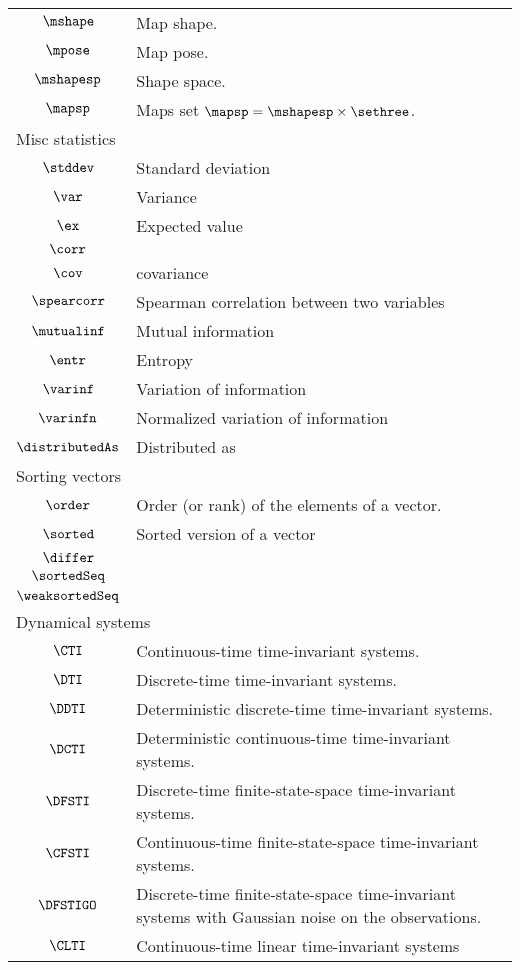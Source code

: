 \begin{longtable}{cl}
 \hline
$\mshape$ &  Map shape.\\ 
 $\mpose$ &  Map pose.\\ 
 $\mshapesp$ &  Shape space.\\ 
 $\mapsp$ &  Maps set $\mapsp = \mshapesp \times \sethree$.\\ 
 \multicolumn{2}{l}{Misc statistics}\\ 
 \hline
$\stddev$ &  Standard deviation\\ 
 $\var$ &  Variance\\ 
 $\ex$ &  Expected value\\ 
 $\corr$ & \\ 
 $\cov$ &  covariance\\ 
 $\spearcorr$ &  Spearman correlation between two variables\\ 
 $\mutualinf$ &  Mutual information\\ 
 $\entr$ &  Entropy\\ 
 $\varinf$ &  Variation of information\\ 
 $\varinfn$ &  Normalized variation of information\\ 
 $\distributedAs$ &  Distributed as\\ 
 \multicolumn{2}{l}{Sorting vectors}\\ 
 \hline
$\order$ &  Order (or rank) of the elements of a vector.\\ 
 $\sorted$ &  Sorted version of a vector\\ 
 $\differ$ & \\ 
 $\sortedSeq$ & \\ 
 $\weaksortedSeq$ & \\ 
 \multicolumn{2}{l}{Dynamical systems}\\ 
 \hline
$\CTI$ &  Continuous-time time-invariant systems.\\ 
 $\DTI$ &  Discrete-time time-invariant systems.\\ 
 $\DDTI$ &  Deterministic discrete-time time-invariant systems.\\ 
 $\DCTI$ &  Deterministic continuous-time time-invariant systems.\\ 
 $\DFSTI$ &  Discrete-time finite-state-space time-invariant systems.\\ 
 $\CFSTI$ &  Continuous-time finite-state-space time-invariant systems.\\ 
 $\DFSTIGO$ &  Discrete-time finite-state-space time-invariant systems with Gaussian noise on the observations.\\ 
 $\CLTI$ &  Continuous-time linear time-invariant systems\\ 

\end{longtable}
